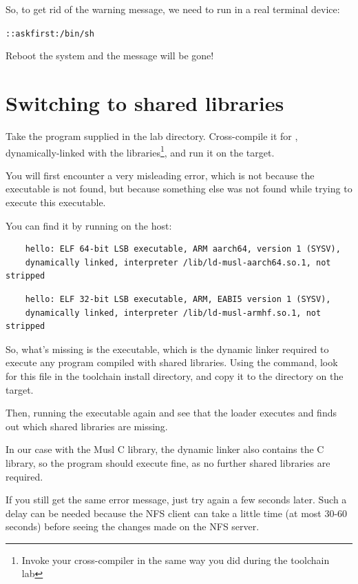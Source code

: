 So, to get rid of the warning message, we need  to run
 in a real terminal device:

{\tt \ttyname::askfirst:/bin/sh}

Reboot the system and the message will be gone!

\section{Switching to shared libraries}

Take the  program supplied in the lab 
directory. Cross-compile it for ,
dynamically-linked with the libraries\footnote{Invoke your cross-compiler
in the same way you did during the toolchain lab}, and run it on the target.

You will first encounter a very misleading  error,
which is not because the  executable is not found, but
because something else was not found while trying to execute
this executable.

You can find it by running  on the host:

\if{}
  \begin{verbatim}
    hello: ELF 64-bit LSB executable, ARM aarch64, version 1 (SYSV),
    dynamically linked, interpreter /lib/ld-musl-aarch64.so.1, not stripped
  \end{verbatim}
\else
  \begin{verbatim}
    hello: ELF 32-bit LSB executable, ARM, EABI5 version 1 (SYSV),
    dynamically linked, interpreter /lib/ld-musl-armhf.so.1, not stripped
  \end{verbatim}
\fi
So, what's missing is the 
executable, which is the dynamic linker required to execute any
program compiled with shared libraries. Using the 
command, look for this file in the toolchain install directory,
and copy it to the  directory on the target.

Then, running the executable again and see that the loader executes
and finds out which shared libraries are missing.

In our case with the Musl C library, the dynamic linker also contains the
C library, so the program should execute fine, as no further shared
libraries are required.

If you still get the same error message, just try again a
few seconds later.  Such a delay can be needed because the NFS
client can take a little time (at most 30-60 seconds) before
seeing the changes made on the NFS server.

